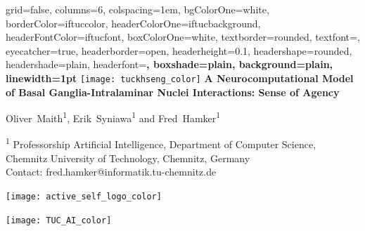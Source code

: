 \documentclass[portrait,final,a0paper,fontscale=0.30]{baposter}
\begin{document}
\begin{poster}%
	{
		grid=false,
		columns=6,
		colspacing=1em,
		bgColorOne=white,
		borderColor=iftuccolor,
		headerColorOne=iftucbackground,
		headerFontColor=iftucfont,
		boxColorOne=white,
		textborder=rounded,
		textfont=\scriptsize,
		eyecatcher=true,
		headerborder=open,
		headerheight=0.1\textheight,
		headershape=rounded,
		headershade=plain,
		headerfont=\Large\bf, %
		boxshade=plain,
		background=plain,
		linewidth=1pt
	}
	{\texttt{[image: tuckhseng\_color]}} 
	{\large\bf{A Neurocomputational Model of Basal Ganglia-Intralaminar Nuclei Interactions: Sense of Agency}\vspace{0.5em}}
	{\normalsize Oliver~Maith\textsuperscript{1}, Erik~Syniawa\textsuperscript{1} and Fred~Hamker\textsuperscript{1} \\ \vspace{0.5em}
		
	\small\textsuperscript{1} Professorship Artificial Intelligence, Department of Computer Science, \\ Chemnitz University of Technology, Chemnitz, Germany \\ \vspace{0.5em}
	\small Contact: fred.hamker@informatik.tu-chemnitz.de
	}
	{
		\begin{minipage}[r]{0.1\textwidth}
			\texttt{[image: active\_self\_logo\_color]}
		\end{minipage}
		\hfill
		\begin{minipage}[r]{0.1\textwidth}
			\texttt{[image: TUC\_AI\_color]}
		\end{minipage}
	}

\end{poster}
\end{document}
